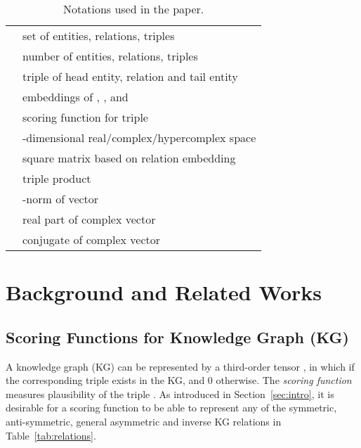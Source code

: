 \documentclass[10pt,journal,compsoc]{IEEEtran}
\begin{document}
\begin{table}[ht]
	\centering
	\vspace{-7px}
	\caption{Notations used in the paper.}
	\label{tab:notations}
	\vspace{-10px}
	\renewcommand{\arraystretch}{1.1}
	\begin{tabular}{c|C{6.3cm}}
		\toprule
   &   set of entities, relations, triples \\
		 & number of entities, relations, triples \\ 
		 & triple of head entity, relation and tail entity \\
		 & embeddings of , , and  \\ 
		 & scoring function for triple  \\ 
		 & -dimensional real/complex/hypercomplex space \\
		 & square matrix based on relation embedding  \\
		 & triple product  \\
		 & -norm of vector  \\
		 & real part of complex vector  \\
		 & conjugate of complex vector   \\
		\bottomrule
	\end{tabular}
	\vspace{-10px}
\end{table}


\section{Background and Related Works}
\label{sec:relworks}


\subsection{Scoring Functions for Knowledge Graph (KG)}
\label{ssec:kg}

A knowledge graph 
(KG)
can be represented by a third-order tensor ,
in which 
 if
the corresponding triple  
exists
in the KG, and 0
otherwise.
The {\em scoring function}  measures plausibility of the triple .
As introduced in Section~\ref{sec:intro},
it is
desirable 
for a scoring function 
to be 
able to represent  any of the
symmetric, anti-symmetric, general asymmetric and inverse
KG relations  
in Table~\ref{tab:relations}.
\end{document}
